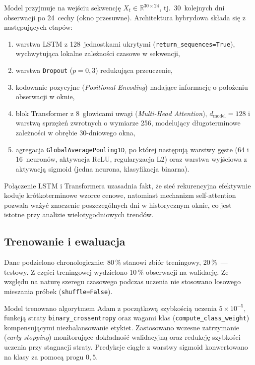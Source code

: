 Model przyjmuje na wejściu sekwencję $X_t \in \mathbb{R}^{30 \times 24}$,
tj.\ 30~kolejnych dni obserwacji po 24~cechy (okno przesuwne).
Architektura hybrydowa składa się z następujących etapów:
\begin{enumerate}
    \item warstwa LSTM z 128~jednostkami ukrytymi (\texttt{return\_sequences=True}),
          wychwytująca lokalne zależności czasowe w sekwencji,
    \item warstwa \texttt{Dropout} ($p = 0{,}3$) redukująca przeuczenie,
    \item kodowanie pozycyjne (\emph{Positional Encoding}) nadające informację o położeniu obserwacji w oknie,
    \item blok Transformer z 8~głowicami uwagi (\emph{Multi-Head Attention}),
          $d_{\text{model}} = 128$ i warstwą sprzężeń zwrotnych o wymiarze 256,
          modelujący długoterminowe zależności w obrębie 30-dniowego okna,
    \item agregacja \texttt{GlobalAveragePooling1D}, po której następują warstwy gęste
          (64 i 16~neuronów, aktywacja ReLU, regularyzacja L2) oraz warstwa wyjściowa
          z aktywacją sigmoid (jedna neurona, klasyfikacja binarna).
\end{enumerate}

Połączenie LSTM i Transformera uzasadnia fakt, że sieć rekurencyjna efektywnie koduje krótkoterminowe wzorce cenowe,
natomiast mechanizm self-attention pozwala ważyć znaczenie poszczególnych dni w historycznym oknie,
co jest istotne przy analizie wielotygodniowych trendów.

\subsection*{Trenowanie i ewaluacja}

Dane podzielono chronologicznie: 80\,\% stanowi zbiór treningowy, 20\,\%~--- testowy.
Z części treningowej wydzielono 10\,\% obserwacji na walidację.
Ze względu na naturę szeregu czasowego podczas uczenia nie stosowano losowego mieszania próbek (\texttt{shuffle=False}).

Model trenowano algorytmem Adam z początkową szybkością uczenia $5 \times 10^{-5}$,
funkcją straty \texttt{binary\_crossentropy} oraz wagami klas (\texttt{compute\_class\_weight})
kompensującymi niezbalansowanie etykiet.
Zastosowano wczesne zatrzymanie (\emph{early stopping}) monitorujące dokładność walidacyjną
oraz redukcję szybkości uczenia przy stagnacji straty.
Predykcje ciągłe z warstwy sigmoid konwertowano na klasy za pomocą progu $0{,}5$.


